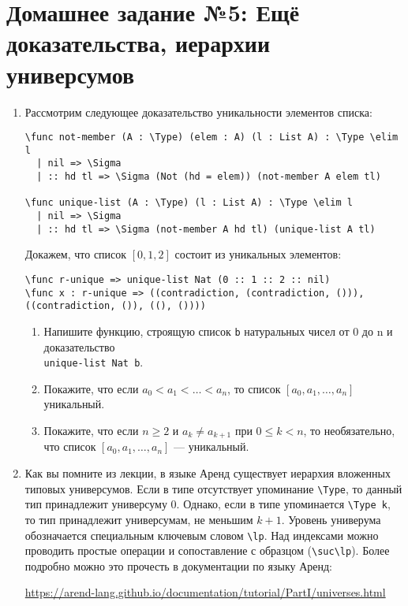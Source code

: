 \documentclass[10pt,a4paper,oneside]{article}
\begin{document}
\section*{Домашнее задание №5: Ещё доказательства, иерархии универсумов}
\begin{enumerate}
\item Рассмотрим следующее доказательство уникальности элементов списка:
\begin{verbatim}
\func not-member (A : \Type) (elem : A) (l : List A) : \Type \elim l
  | nil => \Sigma
  | :: hd tl => \Sigma (Not (hd = elem)) (not-member A elem tl)

\func unique-list (A : \Type) (l : List A) : \Type \elim l
  | nil => \Sigma
  | :: hd tl => \Sigma (not-member A hd tl) (unique-list A tl)
\end{verbatim}

Докажем, что список $[0,1,2]$ состоит из уникальных элементов:
\begin{verbatim}
\func r-unique => unique-list Nat (0 :: 1 :: 2 :: nil)
\func x : r-unique => ((contradiction, (contradiction, ())), ((contradiction, ()), ((), ())))
\end{verbatim}

\begin{enumerate} 
\item Напишите функцию, строящую список \verb!b! натуральных чисел от 0 до n и доказательство\\ \verb!unique-list Nat b!.
\item Покажите, что если $a_0 < a_1 < \dots < a_n$, то список $[a_0,a_1,\dots,a_n]$ уникальный.
\item Покажите, что если $n \ge 2$ и $a_k \ne a_{k+1}$ при $0 \le k < n$, то необязательно, что список
$[a_0,a_1,\dots,a_n]$ --- уникальный.
\end{enumerate}

\item Как вы помните из лекции, в языке Аренд существует иерархия вложенных типовых универсумов. Если в типе отсутствует
упоминание \verb!\Type!, то данный тип принадлежит универсуму 0. Однако, если в типе упоминается \verb!\Type k!,
то тип принадлежит универсумам, не меньшим $k+1$. Уровень универума обозначается специальным ключевым словом \verb!\lp!.
Над индексами можно проводить простые операции и сопоставление с образцом (\verb!\suc\lp!). Более подробно
можно это прочесть в документации по языку Аренд:

\url{https://arend-lang.github.io/documentation/tutorial/PartI/universes.html}


\end{enumerate}
\end{document}
